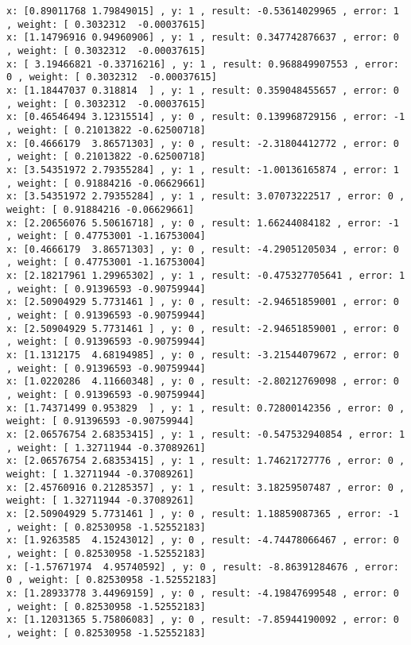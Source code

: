 \documentclass[11pt]{article}
\begin{document}
    \begin{Verbatim}[commandchars=\\\{\}]
x: [0.89011768 1.79849015] , y: 1 , result: -0.53614029965 , error: 1 , weight: [ 0.3032312  -0.00037615]
x: [1.14796916 0.94960906] , y: 1 , result: 0.347742876637 , error: 0 , weight: [ 0.3032312  -0.00037615]
x: [ 3.19466821 -0.33716216] , y: 1 , result: 0.968849907553 , error: 0 , weight: [ 0.3032312  -0.00037615]
x: [1.18447037 0.318814  ] , y: 1 , result: 0.359048455657 , error: 0 , weight: [ 0.3032312  -0.00037615]
x: [0.46546494 3.12315514] , y: 0 , result: 0.139968729156 , error: -1 , weight: [ 0.21013822 -0.62500718]
x: [0.4666179  3.86571303] , y: 0 , result: -2.31804412772 , error: 0 , weight: [ 0.21013822 -0.62500718]
x: [3.54351972 2.79355284] , y: 1 , result: -1.00136165874 , error: 1 , weight: [ 0.91884216 -0.06629661]
x: [3.54351972 2.79355284] , y: 1 , result: 3.07073222517 , error: 0 , weight: [ 0.91884216 -0.06629661]
x: [2.20656076 5.50616718] , y: 0 , result: 1.66244084182 , error: -1 , weight: [ 0.47753001 -1.16753004]
x: [0.4666179  3.86571303] , y: 0 , result: -4.29051205034 , error: 0 , weight: [ 0.47753001 -1.16753004]
x: [2.18217961 1.29965302] , y: 1 , result: -0.475327705641 , error: 1 , weight: [ 0.91396593 -0.90759944]
x: [2.50904929 5.7731461 ] , y: 0 , result: -2.94651859001 , error: 0 , weight: [ 0.91396593 -0.90759944]
x: [2.50904929 5.7731461 ] , y: 0 , result: -2.94651859001 , error: 0 , weight: [ 0.91396593 -0.90759944]
x: [1.1312175  4.68194985] , y: 0 , result: -3.21544079672 , error: 0 , weight: [ 0.91396593 -0.90759944]
x: [1.0220286  4.11660348] , y: 0 , result: -2.80212769098 , error: 0 , weight: [ 0.91396593 -0.90759944]
x: [1.74371499 0.953829  ] , y: 1 , result: 0.72800142356 , error: 0 , weight: [ 0.91396593 -0.90759944]
x: [2.06576754 2.68353415] , y: 1 , result: -0.547532940854 , error: 1 , weight: [ 1.32711944 -0.37089261]
x: [2.06576754 2.68353415] , y: 1 , result: 1.74621727776 , error: 0 , weight: [ 1.32711944 -0.37089261]
x: [2.45760916 0.21285357] , y: 1 , result: 3.18259507487 , error: 0 , weight: [ 1.32711944 -0.37089261]
x: [2.50904929 5.7731461 ] , y: 0 , result: 1.18859087365 , error: -1 , weight: [ 0.82530958 -1.52552183]
x: [1.9263585  4.15243012] , y: 0 , result: -4.74478066467 , error: 0 , weight: [ 0.82530958 -1.52552183]
x: [-1.57671974  4.95740592] , y: 0 , result: -8.86391284676 , error: 0 , weight: [ 0.82530958 -1.52552183]
x: [1.28933778 3.44969159] , y: 0 , result: -4.19847699548 , error: 0 , weight: [ 0.82530958 -1.52552183]
x: [1.12031365 5.75806083] , y: 0 , result: -7.85944190092 , error: 0 , weight: [ 0.82530958 -1.52552183]

\end{Verbatim}
\end{document}
